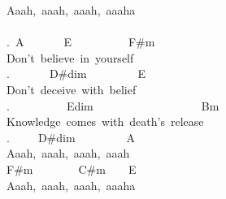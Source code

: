 {Aaah,\ aaah,\ aaah,\ aaaha\\
\\
.\ A\ \ \ \ \ \ \ E\ \ \ \ \ \ \ \ \ \ F\#m\\
Don't\ believe\ in\ yourself\\
.\ \ \ \ \ \ \ D\#dim\ \ \ \ \ \ \ \ \ E\\
Don't\ deceive\ with\ belief\\
.\ \ \ \ \ \ \ \ \ \ Edim\ \ \ \ \ \ \ \ \ \ \ \ \ \ \ \ \ \ \ Bm\\
Knowledge\ comes\ with\ death's\ release\\
.\ \ \ \ \ D\#dim\ \ \ \ \ \ \ \ \ A\\
Aaah,\ aaah,\ aaah,\ aaah\\
F\#m\ \ \ \ \ \ \ \ C\#m\ \ \ \ E\\
Aaah,\ aaah,\ aaah,\ aaaha\\}


